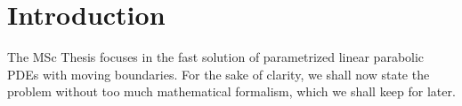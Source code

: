 \documentclass[../main.tex]{subfiles}
\begin{document}

        





\section{Introduction}
The MSc Thesis focuses in the fast solution of parametrized linear parabolic PDEs with moving boundaries.
For the sake of clarity, we shall now state the problem without too much mathematical formalism, which we shall keep for later.
\end{document}
